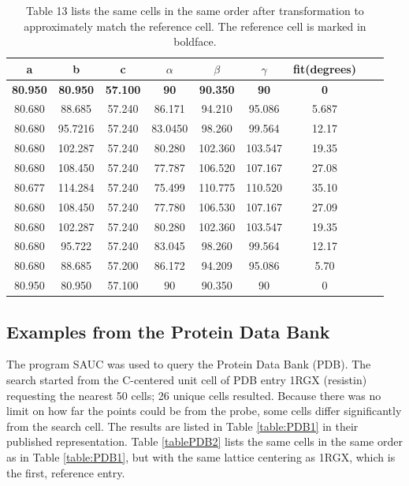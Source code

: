 \documentclass[preprint]{iucr}              %
\numberwithin{equation}{section}
\numberwithin{equation}{section}
\begin{document}
	
	\begin{table}
		\begin{center}
			\caption{Table 13 lists the same cells in the same order after transformation to approximately match the reference cell.
				The reference cell is marked in boldface.}
			\vspace{3mm}
			\begin{tabular}{ccccccccc}
				\toprule
 a & b & c & $\alpha$ & $\beta$ & $\gamma$ & fit(degrees) \\ \midrule         
\textbf{80.950} & \textbf{80.950}  &  \textbf{57.100}  & \textbf{90}  & \textbf{90.350}    & \textbf{90} & \textbf{0}  \\   
80.680 & 88.685  &  57.240  & 86.171  & 94.210    & 95.086 & 5.687  \\
80.680 & 95.7216  & 57.240  & 83.0450  & 98.260    & 99.564 &  12.17  \\
80.680 & 102.287 &  57.240 &  80.280 &  102.360  & 103.547 &  19.35  \\
80.680 & 108.450 &  57.240 &  77.787 &  106.520  & 107.167 & 27.08  \\
80.677 & 114.284 &  57.240 &  75.499 &  110.775  & 110.520 & 35.10  \\
80.680 & 108.450 &  57.240 &  77.780 &  106.530  & 107.167 & 27.09  \\
80.680 & 102.287 &  57.240 &  80.280 &  102.360  & 103.547 &  19.35  \\
80.680 & 95.722  &  57.240  & 83.045  & 98.260    & 99.564 &  12.17  \\
80.680 & 88.685  &  57.200  & 86.172  & 94.209    & 95.086 & 5.70  \\
80.950 & 80.950  &  57.100  & 90  & 90.350    & 90 & 0  \\
				\bottomrule
			\end{tabular}			
			\label{table:AD2}
		\end{center}
	\end{table}	
	
	\subsection{Examples from the Protein Data Bank}
	
	The program SAUC \cite{mcgill2014} was used to query the
	Protein Data Bank (PDB). The search started from the
	C-centered unit cell of PDB entry 1RGX (resistin) requesting the nearest 50 cells;
	26 unique cells resulted. Because there was no limit on
	how far the points could be from the probe, some cells
	differ significantly from the search cell. The results are listed
	in Table \ref{table:PDB1} in their published representation. Table \ref{tablePDB2} lists the same cells
	in the same order as in Table \ref{table:PDB1}, but with 
	the same lattice centering as 1RGX, which is the first, 
	reference entry.
	
\end{document}
